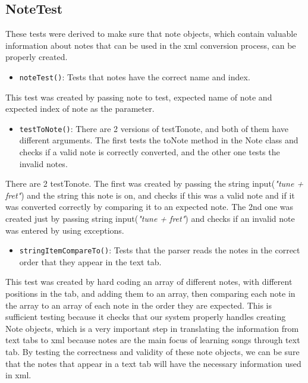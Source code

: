 \documentclass[11pt]{article}
\begin{document}
\subsection{NoteTest}
\label{sec:orgf7581ae}
These tests were derived to make sure that note objects, which contain valuable information about notes that can be used in the xml conversion process, can be properly created. 
\begin{itemize}
\item \texttt{noteTest()}: Tests that notes have the correct name and index.
\end{itemize}
This test was created by passing note to test, expected name of note and expected index of note as the parameter.
\begin{itemize}
\item \texttt{testToNote()}: There are 2 versions of testTonote, and both of them have different arguments. The first tests the toNote method in the Note class and checks if a valid note is correctly converted, and the other one tests the invalid notes.
\end{itemize}
There are 2 testTonote. The first was created by passing the string input(\emph{"tune + fret"}) and the string this note is on, and checks if this was a valid note and if it was converted correctly by comparing it to an expected note. The 2nd one was created just by passing string input(\emph{"tune + fret"}) and checks if an invalid note was entered by using exceptions.
\begin{itemize}
\item \texttt{stringItemCompareTo()}: Tests that the parser reads the notes in the correct order that they appear in the text tab.
\end{itemize}
This test was created by hard coding an array of different notes, with different positions in the tab, and adding them to an array, then comparing each note in the array to an array of each note in the order they are expected.
This is sufficient testing because it checks that our system properly handles creating Note objects, which is a very important step in translating the information from text tabs to xml because notes are the main focus of learning songs through text tab. By testing the correctness and validity of these note objects, we can be sure that the notes that appear in a text tab will have the necessary information used in xml.
\end{document}
